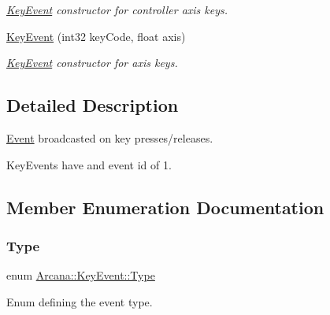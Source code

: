 \begin{DoxyCompactItemize}
\begin{DoxyCompactList}\small\item\em \mbox{\hyperlink{class_arcana_1_1_key_event}{Key\+Event}} constructor for controller axis keys. \end{DoxyCompactList}\item 
\mbox{\label{class_arcana_1_1_key_event_a0c6ab0be338751bb466c1314c35976a2}} 
\mbox{\hyperlink{class_arcana_1_1_key_event_a0c6ab0be338751bb466c1314c35976a2}{Key\+Event}} (int32 key\+Code, float axis)
\begin{DoxyCompactList}\small\item\em \mbox{\hyperlink{class_arcana_1_1_key_event}{Key\+Event}} constructor for axis keys. \end{DoxyCompactList}\end{DoxyCompactItemize}


\subsection{Detailed Description}
\mbox{\hyperlink{class_arcana_1_1_event}{Event}} broadcasted on key presses/releases. 

Key\+Events have and event id of 1. 

\subsection{Member Enumeration Documentation}
\mbox{\label{class_arcana_1_1_key_event_a7e61abd92e372f41647951e8216a93e2}} 
\subsubsection{\texorpdfstring{Type}{Type}}
{\footnotesize\ttfamily enum \mbox{\hyperlink{class_arcana_1_1_key_event_a7e61abd92e372f41647951e8216a93e2}{Arcana\+::\+Key\+Event\+::\+Type}}}



Enum defining the event type. 

